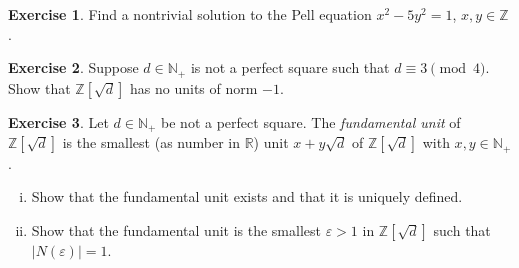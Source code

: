\documentclass[12pt,a4paper]{article}
\theoremstyle{plain}
\newtheorem*{Sol*}{Solution}
\theoremstyle{definition}
\newtheorem{Ex}{Exercise}
\def \N {\mathbb N}
\def \Q {\mathbb Q}
\def \Z {\mathbb Z}
\newif\ifsolutions
\newcommand{\exercise}[2]{
			\begin{Ex} #1 \end{Ex}
			\ifsolutions  \begin{Sol*} #2 \end{Sol*} \bigskip \else \bigskip  \fi
		}
\begin{document}
\exercise{Find a nontrivial  solution to the Pell equation $x^2 - 5 y^2 =1$, $x,y ∈ ℤ$.}{}

\exercise{Suppose $d ∈ℕ_+$ is not a perfect square such that $d ≡ 3 \pmod{4}$. Show that $ℤ[\sqrt{d}]$ has no units of norm $-1$. }
{
	If an element $x+y\sqrt{d} \in \Z[\sqrt{d}]$ has norm $-1$, then one has
		\[ x^2 + y^2 \equiv 3 \pmod{4}. \]
	Since squares have residue 0 or 1 mod 4, this equation admits no solution.
}


\exercise{Let $d ∈ ℕ_+$ be not a perfect square. The \emph{fundamental unit} of $ℤ[\sqrt{d}]$ is the smallest (as number in $ℝ$) unit $x + y \sqrt{d}$ of $ℤ[\sqrt{d}]$ with $x,y ∈ℕ_+$.

\bigskip 

\noindent
\begin{enumerate}[i)]
\item 
  Show that the fundamental unit exists and that it is uniquely defined.
\item Show that the fundamental unit is the smallest $ε>1$ in $ℤ[\sqrt{d}]$ such that $|N(ε)| =  1$. 
\end{enumerate}
}{
	\begin{enumerate}[i)]
		\item
		By exercise 1 of set 3, there exist infinitely many solutions of the equation $N(\alpha) = k, \alpha \in \Z[\sqrt{d}]$ for some integer $k < 1 + 2\sqrt{d}$.
			As such, there must exist two elements $\alpha, \beta \in \Z[\sqrt{d}]$ with coordinates in the basis $\{1, \sqrt{d}\}$ congruent mod $k$.

		One then verifies that $\frac1k \alpha \bar{\beta} \in \Z[\sqrt{d}]$, which concludes, since
			\[  N\left(\frac1k \alpha \bar{\beta}\right) \in \Z[\sqrt{d}] = \frac1{k^2} N(u) N(v) = 1. \]

		The uniqueness is then given by the fact that 1 and $\sqrt{d}$ are linearly independent over $\Q$.
		\item
		We show that units of $\Z[\sqrt{d}]$ which belong in $\N_+[\sqrt{d}]$ are exactly the elements of $\Z[\sqrt{d}]$ greater than 1 and of unit norm.

		First, let $\alpha = x + y\sqrt{d}$ be a unit of $\Z[\sqrt{d}]$ with $x, y > 0$. Clearly, $\alpha > 1$.
		Furthermore, $N(\alpha) N(\alpha^{-1}) = N(1) = 1$, which means that $N(\alpha)$ is a unit of $\Z$, ie. $\pm1$.

		On the other hand, let $\epsilon = x + y\sqrt{d} \in \Z[\sqrt{d}]$ such that $\epsilon > 1$ and $|N(\alpha)|$ = 1.
		Then $N(\epsilon) = \epsilon \bar{\epsilon} = \pm1$, where $\bar{\epsilon} = x - y \sqrt{d} \in \Z[\sqrt{d}]$.
		Hence $\epsilon^{-1} = \pm \epsilon$, and $\epsilon$ is a unit.

		Finally, we show that the cases $(x \leq 0, y \leq 0)$, $(x \leq 0, y \geq 0)$, $(x \geq 0, y \leq 0)$ are impossible.
		The first case is clear.
		In the second case, since $\epsilon^{-1} = \pm \bar{\epsilon}$, then either $\bar{\epsilon} < 0$ or $-\bar{\epsilon} \geq \epsilon > 1$ allows us to find a contradiction.
		The third case is similar.

	\end{enumerate}
}
\end{document}
